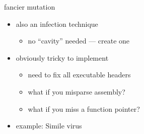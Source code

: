 \begin{frame}{fancier mutation}
    \begin{itemize}
    \item also an infection technique
        \begin{itemize}
        \item no ``cavity'' needed --- create one
        \end{itemize}
    \item obviously tricky to implement
        \begin{itemize}
        \item need to fix all executable headers
        \item what if you misparse assembly?
        \item what if you miss a function pointer?
        \end{itemize}
    \item example: Simile virus
    \end{itemize}
\end{frame}



